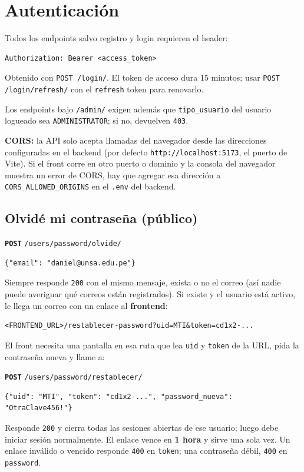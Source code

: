 \documentclass[11pt]{article}
\newcommand{\us}{\_\allowbreak}
\newcommand{\metodo}[2]{\textbf{\texttt{#1}} \texttt{#2}}
\begin{document}
\section{Autenticaci\'on}

Todos los endpoints salvo registro y login requieren el header:
\begin{lstlisting}
Authorization: Bearer <access_token>
\end{lstlisting}
Obtenido con \texttt{POST /login/}. El token de acceso dura 15 minutos; usar \texttt{POST /login/refresh/} con el \texttt{refresh} token para renovarlo.

Los endpoints bajo \texttt{/admin/} exigen adem\'as que \texttt{tipo\us usuario} del usuario logueado sea \texttt{ADMINISTRATOR}; si no, devuelven \texttt{403}.

\textbf{CORS:} la API solo acepta llamadas del navegador desde las direcciones configuradas en el backend (por defecto \texttt{http://localhost:5173}, el puerto de Vite). Si el front corre en otro puerto o dominio y la consola del navegador muestra un error de CORS, hay que agregar esa direcci\'on a \texttt{CORS\us ALLOWED\us ORIGINS} en el \texttt{.env} del backend.

\subsection*{Olvid\'e mi contrase\~na (p\'ublico)}
\metodo{POST}{/users/password/olvide/}
\begin{lstlisting}
{"email": "daniel@unsa.edu.pe"}
\end{lstlisting}
Siempre responde \texttt{200} con el mismo mensaje, exista o no el correo (as\'i nadie puede averiguar qu\'e correos est\'an registrados). Si existe y el usuario est\'a activo, le llega un correo con un enlace al \textbf{frontend}:
\begin{lstlisting}
<FRONTEND_URL>/restablecer-password?uid=MTI&token=cd1x2-...
\end{lstlisting}
El front necesita una pantalla en esa ruta que lea \texttt{uid} y \texttt{token} de la URL, pida la contrase\~na nueva y llame a:

\metodo{POST}{/users/password/restablecer/}
\begin{lstlisting}
{"uid": "MTI", "token": "cd1x2-...", "password_nueva": "OtraClave456!"}
\end{lstlisting}
Responde \texttt{200} y cierra todas las sesiones abiertas de ese usuario; luego debe iniciar sesi\'on normalmente. El enlace vence en \textbf{1 hora} y sirve una sola vez. Un enlace inv\'alido o vencido responde \texttt{400} en \texttt{token}; una contrase\~na d\'ebil, \texttt{400} en \texttt{password}.
\end{document}
